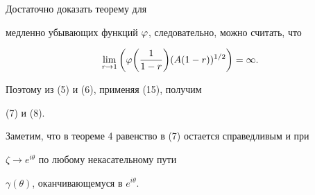 Достаточно доказать теорему для


медленно убывающих функций $\varphi$, следовательно, можно считать, что


$$


\lim_{r\to 1}


\bigg(\p\bigg(\frac 1{1-r}\bigg)(A(1-r))^{1/2}\bigg)=\infty.


$$


Поэтому из (5) и (6), применяя (15), получим


(7) и (8).


\medskip





Заметим, что в теореме 4 равенство в (7) остается справедливым и при


$\zeta\to e^{i\theta}$ по любому некасательному пути


$\gamma(\theta)$, оканчивающемуся в $e^{i\theta}$.












